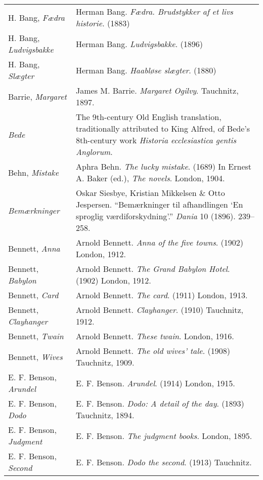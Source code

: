 \begin{longtable}{p{} p{}}
H. Bang, \textit{Fædra} &  Herman Bang. \textit{Fædra. Brudstykker af et livs historie}. (1883) \\
H. Bang, \textit{Ludvigsbakke} & Herman Bang. \textit{Ludvigsbakke}. (1896) \\
H. Bang, \textit{Slægter} & Herman Bang. \textit{Haabløse slægter}. (1880) \\

Barrie, \textit{Margaret} & James M. Barrie. \textit{Margaret Ogilvy}. Tauchnitz, 1897. \\

\textit{Bede} & The 9th-century Old English translation, traditionally attributed to King Alfred, of Bede's 8th-century work \textit{Historia ecclesiastica gentis Anglorum}. \\

Behn, \textit{Mistake} & Aphra Behn. \textit{The lucky mistake}. (1689) In Ernest A. Baker (ed.), \textit{The novels}. London, 1904. \\

\textit{Bemærkninger} & Oskar Siesbye, Kristian Mikkelsen \& Otto Jespersen. ``Bemærkninger til afhandlingen `En sproglig værdiforskydning'.'' \textit{Dania} 10 (1896). 239--258. \\

Bennett, \textit{Anna} & Arnold Bennett. \textit{Anna of the five towns}. (1902) London, 1912. \\
Bennett, \textit{Babylon} & Arnold Bennett. \textit{The Grand Babylon Hotel}. (1902) London, 1912. \\ %
Bennett, \textit{Card} & Arnold Bennett. \textit{The card}. (1911) London, 1913. \\
Bennett, \textit{Clayhanger} & Arnold Bennett. \textit{Clayhanger}. (1910) Tauchnitz, 1912. \\
Bennett, \textit{Twain} & Arnold Bennett. \textit{These twain}. London, 1916. \\
Bennett, \textit{Wives} & Arnold Bennett. \textit{The old wives' tale}. (1908) Tauchnitz, 1909. \\

E. F. Benson, \textit{Arundel} & E. F. Benson. \textit{Arundel}. (1914) London, 1915. \\
E. F. Benson, \textit{Dodo} & E. F. Benson. \textit{Dodo: A detail of the day}. (1893)  Tauchnitz, 1894.\\
E. F. Benson, \textit{Judgment} & E. F. Benson. \textit{The judgment books}. London, 1895. \\
E. F. Benson, \textit{Second} & E. F. Benson. \textit{Dodo the second}. (1913) Tauchnitz. \\ 


\end{longtable}

